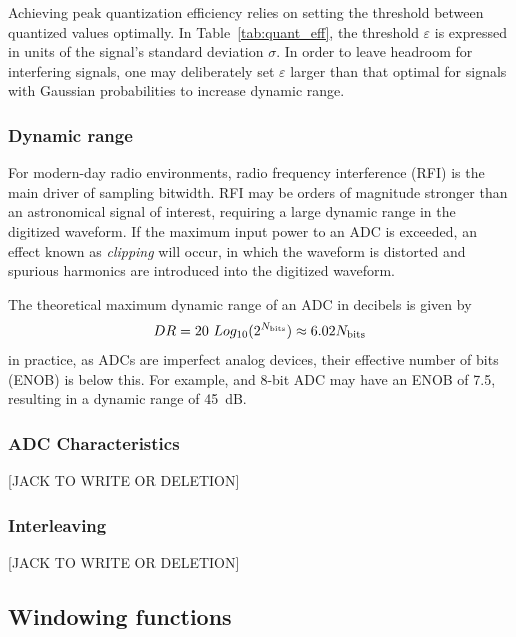 \documentclass{ws-rv961x669}
\begin{document}
Achieving peak quantization efficiency relies on setting the threshold between quantized values optimally. In Table~\ref{tab:quant_eff}, the threshold $\varepsilon$ is expressed in units of the signal's standard deviation $\sigma$. In order to leave headroom for interfering signals, one may deliberately set $\varepsilon$ larger than that optimal for signals with Gaussian probabilities to increase dynamic range.


\subsubsection{Dynamic range\label{sub:dynamic-range}}

For modern-day radio environments, radio frequency interference (RFI) is the main driver of sampling bitwidth. RFI may be orders of magnitude stronger than an astronomical signal of interest, requiring a large dynamic range in the digitized waveform. If the maximum input power to an ADC is exceeded, an effect known as \emph{clipping} will occur, in which the waveform is distorted and spurious harmonics are introduced into the digitized waveform.

The theoretical maximum dynamic range of an ADC in decibels is given by 
\begin{equation}
	DR = 20~Log_{10}(2^{N_{\rm{bits}}}) \approx 6.02 N_{\rm{bits}}
\end{equation}
in practice, as ADCs are imperfect analog devices, their effective number of bits (ENOB) is below this. For example, and 8-bit ADC may have an ENOB of 7.5, resulting in a dynamic range of 45~dB.

\subsubsection{ADC Characteristics}

[JACK TO WRITE OR DELETION]

\subsubsection{Interleaving}

[JACK TO WRITE OR DELETION]

\subsection{Windowing functions}
\end{document}
